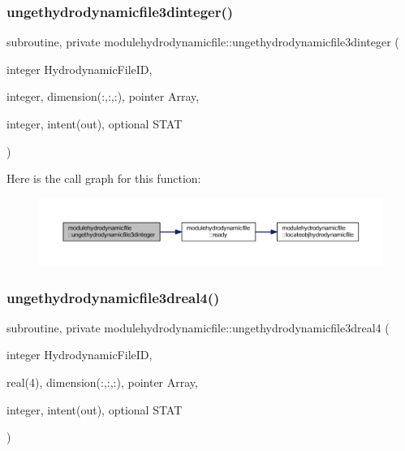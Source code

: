 \subsubsection{\texorpdfstring{ungethydrodynamicfile3dinteger()}{ungethydrodynamicfile3dinteger()}}
{\footnotesize\ttfamily subroutine, private modulehydrodynamicfile\+::ungethydrodynamicfile3dinteger (\begin{DoxyParamCaption}\item[{integer}]{Hydrodynamic\+File\+ID,  }\item[{integer, dimension(\+:,\+:,\+:), pointer}]{Array,  }\item[{integer, intent(out), optional}]{S\+T\+AT }\end{DoxyParamCaption})\hspace{0.3cm}{\ttfamily [private]}}

Here is the call graph for this function\+:\nopagebreak
\begin{figure}[H]
\begin{center}
\leavevmode
\includegraphics[width=350pt]{namespacemodulehydrodynamicfile_ac5cff7872d6994174eb551c203e0e56a_cgraph}
\end{center}
\end{figure}
\mbox{\label{namespacemodulehydrodynamicfile_a56a478bf1d00b0e9a1ea2795005d1b01}} 
\subsubsection{\texorpdfstring{ungethydrodynamicfile3dreal4()}{ungethydrodynamicfile3dreal4()}}
{\footnotesize\ttfamily subroutine, private modulehydrodynamicfile\+::ungethydrodynamicfile3dreal4 (\begin{DoxyParamCaption}\item[{integer}]{Hydrodynamic\+File\+ID,  }\item[{real(4), dimension(\+:,\+:,\+:), pointer}]{Array,  }\item[{integer, intent(out), optional}]{S\+T\+AT }\end{DoxyParamCaption})\hspace{0.3cm}{\ttfamily [private]}}

